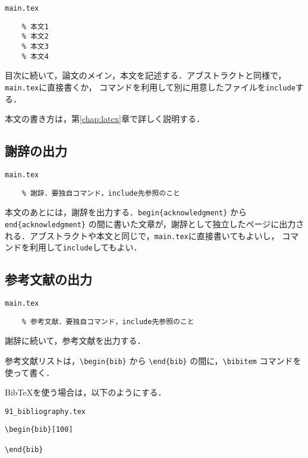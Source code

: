 \begin{itembox}[l]{\texttt{main.tex}}
\begin{verbatim}
	% 本文1
	% 本文2
	% 本文3
	% 本文4
\end{verbatim}
\end{itembox}

目次に続いて，論文のメイン，本文を記述する．アブストラクトと同様で，\texttt{main.tex}に直接書くか，\verb|| コマンドを利用して別に用意したファイルを\texttt{include}する．

本文の書き方は，第\ref{chap:latex}章で詳しく説明する．


\subsection{謝辞の出力}

\begin{itembox}[l]{\texttt{main.tex}}
\begin{verbatim}
	% 謝辞．要独自コマンド，include先参照のこと
\end{verbatim}
\end{itembox}

本文のあとには，謝辞を出力する．\verb|begin{acknowledgment}| から \verb|end{acknowledgment}| の間に書いた文章が，謝辞として独立したページに出力される．アブストラクトや本文と同じで，\texttt{main.tex}に直接書いてもよいし，\verb|| コマンドを利用して\texttt{include}してもよい．


\subsection{参考文献の出力}

\begin{itembox}[l]{\texttt{main.tex}}
\begin{verbatim}
	% 参考文献．要独自コマンド，include先参照のこと
\end{verbatim}
\end{itembox}

謝辞に続いて，参考文献を出力する．

参考文献リストは，\verb|\begin{bib}| から \verb|\end{bib}| の間に，\verb|\bibitem| コマンドを使って書く．

BibTeXを使う場合は，以下のようにする．

\begin{itembox}[l]{\texttt{91\_bibliography.tex}}
\begin{verbatim}
\begin{bib}[100]

\end{bib}
\end{verbatim}
\end{itembox}

